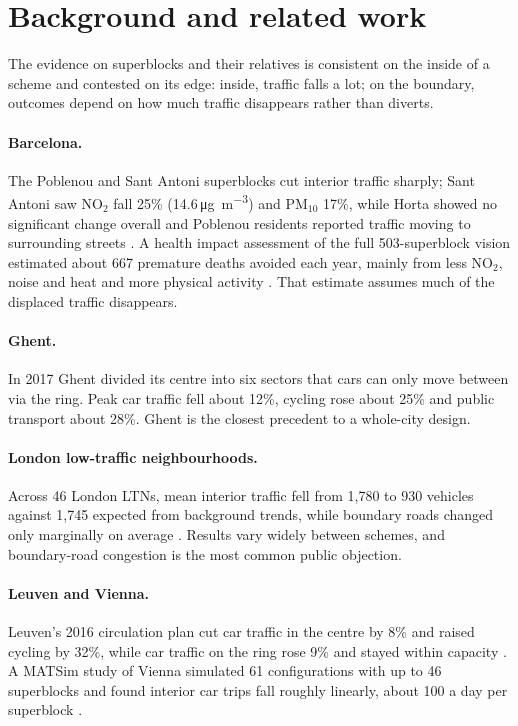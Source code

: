 \documentclass[11pt,a4paper]{article}
\begin{document}
\section{Background and related work}

The evidence on superblocks and their relatives is consistent on the inside of a scheme and contested on its edge: inside, traffic falls a lot; on the boundary, outcomes depend on how much traffic disappears rather than diverts.

\paragraph{Barcelona.} The Poblenou and Sant Antoni superblocks cut interior traffic sharply; Sant Antoni saw NO$_2$ fall 25\% (14.6\,\si{\micro\gram\per\cubic\metre}) and PM$_{10}$ 17\%, while Horta showed no significant change overall and Poblenou residents reported traffic moving to surrounding streets \citep{perez2025}. A health impact assessment of the full 503-superblock vision estimated about 667 premature deaths avoided each year, mainly from less NO$_2$, noise and heat and more physical activity \citep{mueller2020}. That estimate assumes much of the displaced traffic disappears.

\paragraph{Ghent.} In 2017 Ghent divided its centre into six sectors that cars can only move between via the ring. Peak car traffic fell about 12\%, cycling rose about 25\% and public transport about 28\%. Ghent is the closest precedent to a whole-city design.

\paragraph{London low-traffic neighbourhoods.} Across 46 London LTNs, mean interior traffic fell from 1,780 to 930 vehicles against 1,745 expected from background trends, while boundary roads changed only marginally on average \citep{thomas2024}. Results vary widely between schemes, and boundary-road congestion is the most common public objection.

\paragraph{Leuven and Vienna.} Leuven's 2016 circulation plan cut car traffic in the centre by 8\% and raised cycling by 32\%, while car traffic on the ring rose 9\% and stayed within capacity \citep{leuven2017}. A MATSim study of Vienna simulated 61 configurations with up to 46 superblocks and found interior car trips fall roughly linearly, about 100 a day per superblock \citep{mueller2023}.
\end{document}
